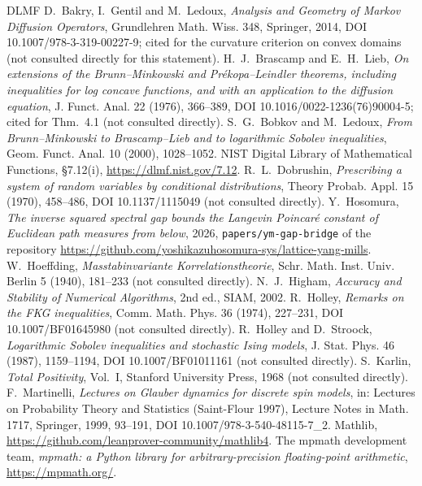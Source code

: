 \documentclass[11pt,a4paper]{article}
\theoremstyle{definition}
\theoremstyle{remark}
\newcommand{\code}[1]{\texttt{#1}}
\begin{document}
\begin{thebibliography}{DLMF}
 D.~Bakry, I.~Gentil and M.~Ledoux, \emph{Analysis and Geometry of Markov Diffusion Operators}, Grundlehren Math. Wiss. 348, Springer, 2014, DOI 10.1007/978-3-319-00227-9; cited for the curvature criterion on convex domains (not consulted directly for this statement).
 H.~J.~Brascamp and E.~H.~Lieb, \emph{On extensions of the Brunn--Minkowski and Pr\'ekopa--Leindler theorems, including inequalities for log concave functions, and with an application to the diffusion equation}, J. Funct. Anal. 22 (1976), 366--389, DOI 10.1016/0022-1236(76)90004-5; cited for Thm.~4.1 (not consulted directly).
 S.~G.~Bobkov and M.~Ledoux, \emph{From Brunn--Minkowski to Brascamp--Lieb and to logarithmic Sobolev inequalities}, Geom. Funct. Anal. 10 (2000), 1028--1052.
 NIST Digital Library of Mathematical Functions, \S7.12(i), \url{https://dlmf.nist.gov/7.12}.
 R.~L.~Dobrushin, \emph{Prescribing a system of random variables by conditional distributions}, Theory Probab. Appl. 15 (1970), 458--486, DOI 10.1137/1115049 (not consulted directly).
 Y.~Hosomura, \emph{The inverse squared spectral gap bounds the Langevin Poincar\'e constant of Euclidean path measures from below}, 2026, \code{papers/ym-gap-bridge} of the repository \url{https://github.com/yoshikazuhosomura-sys/lattice-yang-mills}.
 W.~Hoeffding, \emph{Masstabinvariante Korrelationstheorie}, Schr. Math. Inst. Univ. Berlin 5 (1940), 181--233 (not consulted directly).
 N.~J.~Higham, \emph{Accuracy and Stability of Numerical Algorithms}, 2nd ed., SIAM, 2002.
 R.~Holley, \emph{Remarks on the FKG inequalities}, Comm. Math. Phys. 36 (1974), 227--231, DOI 10.1007/BF01645980 (not consulted directly).
 R.~Holley and D.~Stroock, \emph{Logarithmic Sobolev inequalities and stochastic Ising models}, J. Stat. Phys. 46 (1987), 1159--1194, DOI 10.1007/BF01011161 (not consulted directly).
 S.~Karlin, \emph{Total Positivity}, Vol.~I, Stanford University Press, 1968 (not consulted directly).
 F.~Martinelli, \emph{Lectures on Glauber dynamics for discrete spin models}, in: Lectures on Probability Theory and Statistics (Saint-Flour 1997), Lecture Notes in Math. 1717, Springer, 1999, 93--191, DOI 10.1007/978-3-540-48115-7\_2.
 Mathlib, \url{https://github.com/leanprover-community/mathlib4}.
 The mpmath development team, \emph{mpmath: a Python library for arbitrary-precision floating-point arithmetic}, \url{https://mpmath.org/}.

\end{thebibliography}
\end{document}
